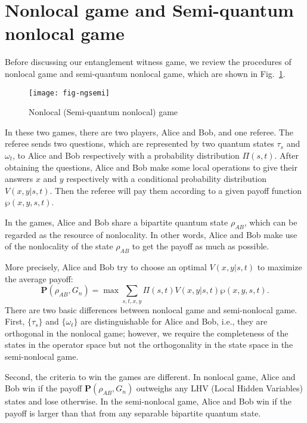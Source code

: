 \documentclass[twocolumn,pra,showpacs,superscriptaddress]{revtex4-1}
\begin{document}
\section{Nonlocal game and Semi-quantum nonlocal game}

Before discussing our entanglement witness game, we review the procedures of
nonlocal game \cite{cle} and semi-quantum nonlocal game, which
are %
shown in Fig.~\ref{fig1}.
\begin{figure}[hbt!]
\centering
\texttt{[image: fig-ngsemi]}
\caption{Nonlocal (Semi-quantum nonlocal) game}\label{fig1}
\end{figure}

In these two games, there are two players, Alice and Bob, and one
referee. The referee sends two questions, which are represented by two
quantum states $\tau_{s}$ and $\omega_{t}$, to Alice and Bob
respectively with a probability distribution $\Pi(s,t)$. After
obtaining the questions, Alice and Bob make some local operations to
give their answers $x$ and $y$ respectively with a conditional
probability distribution $V(x,y|s,t)$. Then the referee will pay them
according to a given payoff function $\wp(x,y,s,t)$.

In the games, Alice and Bob share a bipartite quantum state
$\rho_{AB}$, which can be regarded as the resource of nonlocality. In
other words, Alice and Bob make use of the nonlocality of the state
$\rho_{AB}$ to get the payoff as much as possible.

More precisely, Alice and Bob try to choose an optimal $V(x,y|s,t)$ to
maximize the average payoff:
\begin{equation*}
  \mathbf{P}(\rho_{AB},G_{n}) = \max \sum_{s,t,x,y} \Pi(s,t) V(x,y|s,t)
  \wp(x,y,s,t).
\end{equation*}
There are two basic differences between nonlocal game and
semi-nonlocal game. First, $\{\tau_{s}\}$ and $\{\omega_{t}\}$ are
distinguishable for Alice and Bob, i.e., they are orthogonal in the
nonlocal game; however, we require the completeness of the states in
the operator space but not the orthogonality in the state space in the
semi-nonlocal game.

Second, the criteria to win the games are different. In nonlocal
game, Alice and Bob win if the payoff $ \textbf{P}(\rho_{AB},G_{n})$
outweighs any LHV (Local Hidden Variables) states and lose otherwise.
In the semi-nonlocal game, Alice and Bob win if the payoff is larger
than that from any separable bipartite quantum state.
\end{document}
